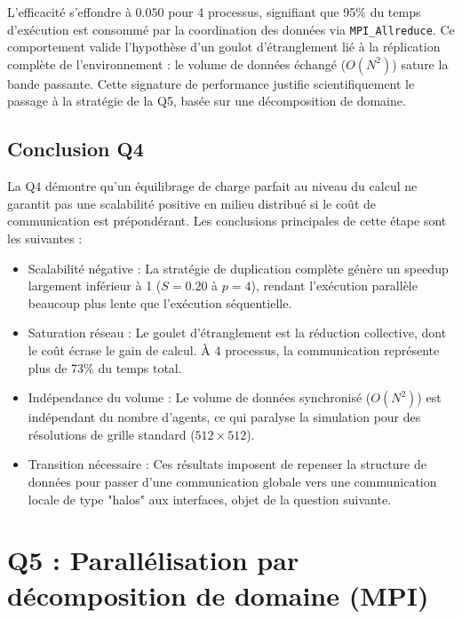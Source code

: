 \documentclass[11pt,a4paper]{article}
\begin{document}
L'efficacité s'effondre à $0.050$ pour 4 processus, signifiant que 95\% du temps d'exécution est consommé par la coordination des données via \texttt{MPI\_Allreduce}. Ce comportement valide l'hypothèse d'un goulot d'étranglement lié à la réplication complète de l'environnement : le volume de données échangé ($O(N^2)$) sature la bande passante. Cette signature de performance justifie scientifiquement le passage à la stratégie de la Q5, basée sur une décomposition de domaine.

\subsection{Conclusion Q4}

La Q4 démontre qu'un équilibrage de charge parfait au niveau du calcul ne garantit pas une scalabilité positive en milieu distribué si le coût de communication est prépondérant. Les conclusions principales de cette étape sont les suivantes :

\begin{itemize}[leftmargin=1.2em]
  \item {Scalabilité négative} : La stratégie de duplication complète génère un speedup largement inférieur à 1 ($S=0.20$ à $p=4$), rendant l'exécution parallèle beaucoup plus lente que l'exécution séquentielle.
  \item {Saturation réseau} : Le goulet d'étranglement est la réduction collective, dont le coût écrase le gain de calcul. À 4 processus, la communication représente plus de 73\% du temps total.
  \item {Indépendance du volume} : Le volume de données synchronisé ($O(N^2)$) est indépendant du nombre d'agents, ce qui paralyse la simulation pour des résolutions de grille standard ($512 \times 512$).
  \item {Transition nécessaire} : Ces résultats imposent de repenser la structure de données pour passer d'une communication globale vers une communication locale de type "halos" aux interfaces, objet de la question suivante.
\end{itemize}


\section{Q5 : Parallélisation par décomposition de domaine (MPI)}
\end{document}
